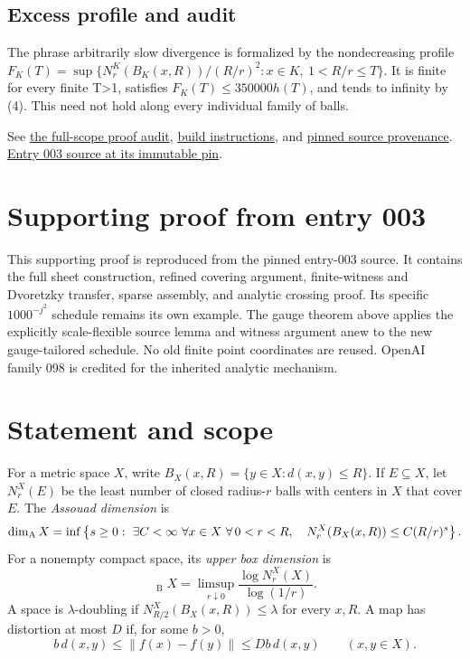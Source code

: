 \documentclass[
  11pt,
]{article}
\theoremstyle{remark}\newtheorem{remark}[theorem]{Remark}
\newcommand{\norm}[1]{\lVert#1\rVert}\newcommand{\ip}[2]{\langle#1,#2\rangle}
\newcommand{\dimB}{\mathop{\overline{\dim}}\nolimits_{\mathrm B}}
\begin{document}
\subsection{Excess profile and audit}\label{excess-profile-and-audit}

The phrase arbitrarily slow divergence is formalized by the
nondecreasing profile
\(F_K(T)=\sup\{N_r^K(B_K(x,R))/(R/r)^2:x\in K,\ 1<R/r\le T\}\). It is
finite for every finite T\textgreater1, satisfies
\(F_K(T)\le350000h(T)\), and tends to infinity by (4). This need not
hold along every individual family of balls.

See \href{PROOF_AUDIT.md}{the full-scope proof audit},
\href{README.md}{build instructions}, and
\href{../avoidance-covering-provenance/README.md}{pinned source
provenance}.
\href{https://github.com/mxym/math/blob/1c67b4146f9e54291c8a5ca1f42a028bf307629f/preprints/003-assouad-two-zero-box/v1/assouad_two_zero_box.tex}{Entry
003 source at its immutable pin}.

\section*{Supporting proof from entry 003}
This supporting proof is reproduced from the pinned entry-003 source.
It contains the full sheet construction, refined covering argument,
finite-witness and Dvoretzky transfer, sparse assembly, and analytic
crossing proof. Its specific $1000^{-j^2}$ schedule remains its own
example. The gauge theorem above applies the explicitly scale-flexible
source lemma and witness argument anew to the new gauge-tailored
schedule. No old finite point coordinates are reused. OpenAI family 098
is credited for the inherited analytic mechanism.
\setcounter{secnumdepth}{3}
\setcounter{section}{0}
\renewcommand{\thesection}{S\arabic{section}}
\section{Statement and scope}
For a metric space $X$, write $B_X(x,R)=\{y\in X:d(x,y)\le R\}$. If $E\subseteq X$, let $N_r^X(E)$ be the least number of closed radius-$r$ balls with centers in $X$ that cover $E$. The \emph{Assouad dimension} is
\[
 \dimA X=\inf\left\{s\ge0:\ \exists C<\infty\ \forall x\in X\ \forall\,0<r<R,
 \quad N_r^X(B_X(x,R))\le C(R/r)^s\right\}.
\]
For a nonempty compact space, its \emph{upper box dimension} is
\[
 \dimB X=\limsup_{r\downarrow0}\frac{\log N_r^X(X)}{\log(1/r)}.
\]
A space is $\lambda$-doubling if $N_{R/2}^X(B_X(x,R))\le\lambda$ for every $x,R$. A map has distortion at most $D$ if, for some $b>0$,
\[
 b\,d(x,y)\le\norm{f(x)-f(y)}\le Db\,d(x,y)\qquad(x,y\in X).
\]
\end{document}
